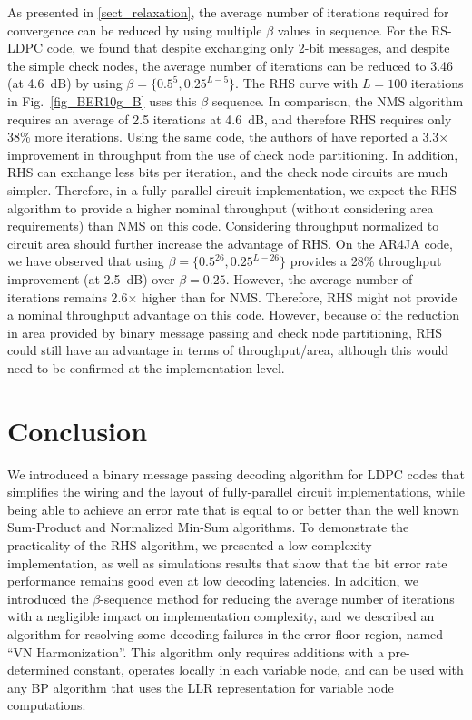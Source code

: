 \documentclass[12pt,journal,twoside,draftcls,onecolumn]{IEEEtran}
\begin{document}
As presented in \ref{sect_relaxation}, the average number of iterations required for convergence can be reduced by using multiple $\beta$ values in sequence. 
For the RS-LDPC code, we found that despite exchanging only 2-bit messages, and despite the simple check nodes, the average number of iterations can be reduced to 3.46 (at 4.6~dB) by using $\beta = \{0.5^5, 0.25^{L-5}\}$. The RHS curve with $L=100$ iterations in Fig.~\ref{fig_BER10g_B} uses this $\beta$ sequence. In comparison, the NMS algorithm requires an average of 2.5 iterations at 4.6~dB, and therefore RHS requires only 38\% more iterations.
Using the same code, the authors of \cite{mohsenin:2010} have reported a 3.3$\times$ improvement in throughput from the use of check node partitioning. In addition, RHS can exchange less bits per iteration, and the check node circuits are much simpler. Therefore, in a fully-parallel circuit implementation, we expect the RHS algorithm to provide a higher nominal throughput (without considering area requirements) than NMS on this code. Considering throughput normalized to circuit area should further increase the advantage of RHS.
On the AR4JA code, we have observed that using $\beta=\{0.5^{26}, 0.25^{L-26}\}$ provides a 28\% throughput improvement (at 2.5~dB) over $\beta=0.25$. However, the average number of iterations remains 2.6$\times$ higher than for NMS. Therefore, RHS might not provide a nominal throughput advantage on this code. However, because of the reduction in area provided by binary message passing and check node partitioning, RHS could still have an advantage in terms of throughput/area, although this would need to be confirmed at the implementation level.


\section{Conclusion}
\label{sect_conclusion}

We introduced a binary message passing decoding algorithm for LDPC codes that simplifies the wiring and the layout of fully-parallel circuit implementations, while being able to achieve an error rate that is equal to or better than the well known Sum-Product and Normalized Min-Sum algorithms.
To demonstrate the practicality of the RHS algorithm, we presented a low complexity implementation, as well as simulations results that show that the bit error rate performance remains good even at low decoding latencies.
In addition, we introduced the $\beta$-sequence method for reducing the average number of iterations with a negligible impact on implementation complexity, and we described an algorithm for resolving some decoding failures in the error floor region, named ``VN Harmonization''. This algorithm only requires additions with a pre-determined constant, operates locally in each variable node, and can be used with any BP algorithm that uses the LLR representation for variable node computations.
\end{document}
